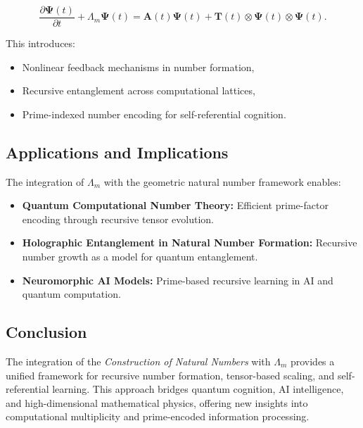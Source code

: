 \documentclass{article}
\theoremstyle{plain}
\begin{document}
\begin{equation}
    \frac{\partial \bm{\Psi}(t)}{\partial t} + \Lambda_m \bm{\Psi}(t) = \bm{A}(t) \bm{\Psi}(t) + \bm{T}(t) \otimes \bm{\Psi}(t) \otimes \bm{\Psi}(t).
\end{equation}

This introduces:
\begin{itemize}
    \item Nonlinear feedback mechanisms in number formation,
    \item Recursive entanglement across computational lattices,
    \item Prime-indexed number encoding for self-referential cognition.
\end{itemize}

\subsection{Applications and Implications}

The integration of $\Lambda_m$ with the geometric natural number framework enables:
\begin{itemize}
    \item \textbf{Quantum Computational Number Theory:} Efficient prime-factor encoding through recursive tensor evolution.
    \item \textbf{Holographic Entanglement in Natural Number Formation:} Recursive number growth as a model for quantum entanglement.
    \item \textbf{Neuromorphic AI Models:} Prime-based recursive learning in AI and quantum computation.
\end{itemize}

\subsection{Conclusion}

The integration of the \textit{Construction of Natural Numbers} with $\Lambda_m$ provides a unified framework for recursive number formation, tensor-based scaling, and self-referential learning. This approach bridges quantum cognition, AI intelligence, and high-dimensional mathematical physics, offering new insights into computational multiplicity and prime-encoded information processing.


\nocite{*}


\end{document}
